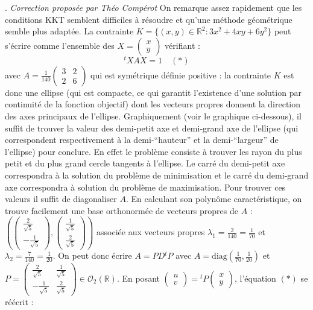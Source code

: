 \documentclass{report}
\begin{document}
. \hfill \textit{Correction proposée par Théo Compérot}\newline
On remarque assez rapidement que les conditions KKT semblent difficiles à résoudre et qu'une méthode géométrique semble plus adaptée. La contrainte $K = \{ (x,y) \in \mathbb R^2 : 3x^2 + 4xy + 6y^2 \}$ peut s'écrire comme l'ensemble des $X = \begin{pmatrix} x \\ y \end{pmatrix}$ vérifiant :
\[ {}^t\! X A X = 1 \quad (\ast) \]
avec $A = \frac{1}{140} \begin{pmatrix} 3 & 2 \\ 2 & 6 \end{pmatrix}$ qui est symétrique définie positive : la contrainte $K$ est donc une ellipse (qui est compacte, ce qui garantit l'existence d'une solution par continuité de la fonction objectif) dont les vecteurs propres donnent la direction des axes principaux de l'ellipse. Graphiquement (voir le graphique ci-dessous), il suffit de trouver la valeur des demi-petit axe et demi-grand axe de l'ellipse (qui correspondent respectivement à la demi-``hauteur'' et la demi-``largeur'' de l'ellipse) pour conclure. En effet le problème consiste à trouver les rayon du plus petit et du plus grand cercle tangents à l'ellipse. Le carré du demi-petit axe correspondra à la solution du problème de minimisation et le carré du demi-grand axe correspondra à solution du problème de maximisation. Pour trouver ces valeurs il suffit de diagonaliser $A$. En calculant son polynôme caractéristique, on trouve facilement une base orthonormée de vecteurs propres de $A$ : $\left(\begin{pmatrix} \frac{2}{\sqrt{5}} \\ -\frac{1}{\sqrt{5}} \end{pmatrix},\begin{pmatrix} \frac{1}{\sqrt{5}} \\ \frac{2}{\sqrt{5}} \end{pmatrix}\right)$ associée aux vecteurs propres $\lambda_1 = \frac{2}{140} = \frac{1}{70}$ et $\lambda_2=\frac{7}{140} = \frac{1}{20}$. On peut donc écrire $A = PD{}^t\!P$ avec $A = \text{diag}(\frac{1}{70},\frac{1}{20})$ et $P = \begin{pmatrix} \frac{2}{\sqrt{5}} & \frac{1}{\sqrt{5}} \\ -\frac{1}{\sqrt{5}} & \frac{2}{\sqrt{5}} \end{pmatrix} \in \mathcal O_2(\mathbb R)$. En posant $\begin{pmatrix} u \\ v \end{pmatrix} = {}^t\!P \begin{pmatrix} x \\ y \end{pmatrix}$, l'équation $(\ast)$ se réécrit :
\end{document}
